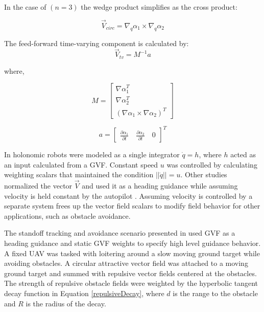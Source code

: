 \documentclass[numbered,pdftex]{ohio-etd}
\begin{document}
\noindent
In the case of $(n=3)$ the wedge product simplifies as the cross product:

\begin{equation}
\overrightarrow{V}_{circ} =  \nabla_q\alpha_1 \times \nabla_q\alpha_2 
\label{circOnlySimp}
\end{equation}

\noindent
The feed-forward time-varying component is calculated by:
\begin{equation}
\label{tv}
\overrightarrow{V}_{tv} = M^{-1}a
\end{equation}

\noindent
where,

\begin{equation}
\label{mMatrix}
M =\begin{bmatrix}
\nabla\alpha_1^T \\
\nabla\alpha_2^T \\
(\nabla\alpha_1 \times \nabla\alpha_2)^T
\end{bmatrix}
\end{equation}

\begin{equation}
\label{aVector}
a =\begin{bmatrix}
\frac{\partial \alpha_1}{\partial t} \quad   \frac{\partial \alpha_2}{\partial t} \quad   0
\end{bmatrix}^T
\end{equation}


In \cite{goncalves_artificial_2009,goncalves_circulation_2010,goncalves_vector_2010} holonomic robots were modeled as a single integrator $\dot{q}=h$, where $h$ acted as an input calculated from a GVF. Constant speed  $u$ was controlled by calculating weighting scalars that maintained the condition $||\dot{q}|| = u$. Other studies normalized the vector $\overrightarrow{V}$ and used it as a heading guidance while assuming velocity is held constant by the autopilot \cite{gerlach_autonomous_2014,wwc}. Assuming velocity is controlled by a separate system frees up the vector field scalars to modify field behavior for other applications, such as obstacle avoidance. 
 
 
 The standoff tracking and avoidance scenario presented in \cite{wwc} used GVF as a heading guidance and static GVF weights to specify high level guidance behavior. A fixed UAV was tasked with loitering around a slow moving ground target while avoiding obstacles. A circular attractive vector field was attached to a moving ground target and summed with repulsive vector fields centered at the obstacles. The strength of repulsive obstacle fields were weighted by the hyperbolic tangent decay function in Equation \ref{repulsiveDecay}, where $d$ is the range to the obstacle and $R$ is the radius of the decay.
 
\end{document}
